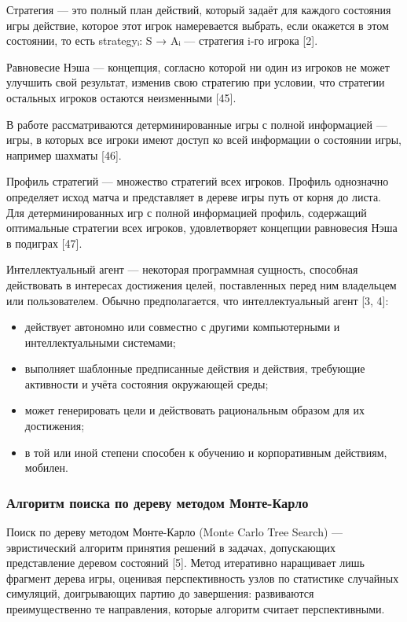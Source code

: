 Стратегия — это полный план действий, который задаёт для каждого состояния игры действие, которое этот игрок намеревается выбрать, если окажется в этом состоянии, то есть strategyᵢ: S → Aᵢ — стратегия i-го игрока [2].

Равновесие Нэша — концепция, согласно которой ни один из игроков не может улучшить свой результат, изменив свою стратегию при условии, что стратегии остальных игроков остаются неизменными [45].

В работе рассматриваются детерминированные игры с полной информацией — игры, в которых все игроки имеют доступ ко всей информации о состоянии игры, например шахматы [46].

Профиль стратегий — множество стратегий всех игроков. Профиль однозначно определяет исход матча и представляет в дереве игры путь от корня до листа. Для детерминированных игр с полной информацией профиль, содержащий оптимальные стратегии всех игроков, удовлетворяет концепции равновесия Нэша в подиграх [47].

Интеллектуальный агент — некоторая программная сущность, способная действовать в интересах достижения целей, поставленных перед ним владельцем или пользователем. Обычно предполагается, что интеллектуальный агент [3, 4]:

\begin{itemize}

  \item действует автономно или совместно с другими компьютерными и интеллектуальными системами;

  \item выполняет шаблонные предписанные действия и действия, требующие активности и учёта состояния окружающей среды;

  \item может генерировать цели и действовать рациональным образом для их достижения;

  \item в той или иной степени способен к обучению и корпоративным действиям, мобилен.

\end{itemize}

\subsubsection{Алгоритм поиска по дереву методом Монте-Карло}

Поиск по дереву методом Монте-Карло (Monte Carlo Tree Search) — эвристический алгоритм принятия решений в задачах, допускающих представление деревом состояний [5]. Метод итеративно наращивает лишь фрагмент дерева игры, оценивая перспективность узлов по статистике случайных симуляций, доигрывающих партию до завершения: развиваются преимущественно те направления, которые алгоритм считает перспективными.

